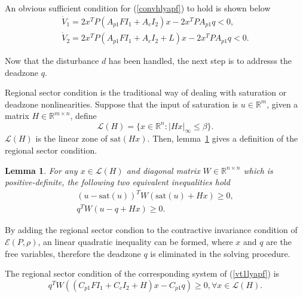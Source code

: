 \documentclass[10pt,final,journal,twoside]{IEEEtran}
\newtheorem{lemma}{Lemma}
\begin{document}
An obvious sufficient condition for (\ref{convhlyapf}) to hold is shown below
\begin{gather}
    \label{vt1lyapf}\dot{V}_1=2x^TP\left(A_{p1}FI_1+A_cI_2\right)x-2x^TPA_{p1}q<0,\\
    \label{vt2lyapf}\dot{V}_2=2x^TP\left(A_{p1}FI_1+A_cI_2+L\right)x-2x^TPA_{p1}q<0.
\end{gather}\par
Now that the disturbance $d$ has been handled, the next step is to addresss the deadzone $q$.\par
Regional sector condition is the traditional way of dealing with saturation or deadzone nonlinearities\cite{bookofzac,bookofli}.
Suppose that the input of saturation is $u\in\mathbb{R}^m$, given a matrix $H\in\mathbb{R}^{m\times n}$, define
\[\mathcal{L}(H)=\{x\in\mathbb{R}^n:|Hx|_{\infty}\leqslant\beta\}.\]
$\mathcal{L}(H)$ is the linear zone of $\mathrm{sat}(Hx)$. Then, lemma~\ref{lemma} gives a definition of
the regional sector condition.
\begin{lemma}\label{lemma}
For any $x\in\mathcal{L}(H)$ and diagonal matrix $W\in\mathbb{R}^{n\times n}$ which is positive-definite, the following two equivalent
inequalities hold
\begin{gather*}
(u-\mathrm{sat}(u))^TW(\mathrm{sat}(u)+Hx)\geqslant0,\\
q^TW(u-q+Hx)\geqslant0.
\end{gather*}
\end{lemma}\par
By adding the regional sector condion to the contractive invariance condition of $\mathcal{E}(P,\rho)$, an linear quadratic inequality can be formed,
where $x$ and $q$ are the free variables, therefore the deadzone $q$ is eliminated in the solving procedure.\par
The regional sector condition of the corresponding system of (\ref{vt1lyapf}) is
\begin{equation}\label{seccond}
q^TW\left(\left(C_{p1}FI_1+C_cI_2+H\right)x-C_{p1}q\right)\geqslant 0,\forall x\in\mathcal{L}(H).
\end{equation}
\end{document}
